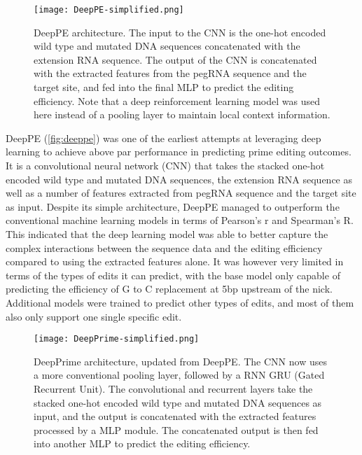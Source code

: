 \begin{figure}
    \centering
    \texttt{[image: DeepPE-simplified.png]}
    \caption[DeepPE architecture]{DeepPE architecture. The input to the CNN is the one-hot encoded wild type and mutated DNA sequences concatenated with the extension RNA sequence. The output of the CNN is concatenated with the extracted features from the pegRNA sequence and the target site, and fed into the final MLP to predict the editing efficiency. Note that a deep reinforcement learning model was used here instead of a pooling layer to maintain local context information.}
    \label{fig:deeppe}
\end{figure}

DeepPE (\autoref{fig:deeppe}) was one of the earliest attempts at leveraging deep learning to achieve above par performance in predicting prime editing outcomes\cite{kimPredictingEfficiencyPrime2021}. It is a convolutional neural network (CNN) that takes the stacked one-hot encoded wild type and  mutated DNA sequences, the extension RNA sequence as well as a number of features extracted from pegRNA sequence and the target site as input. Despite its simple architecture, DeepPE managed to outperform the conventional machine learning models in terms of Pearson's r and Spearman's R. This indicated that the deep learning model was able to better capture the complex interactions between the sequence data and the editing efficiency compared to using the extracted features alone. It was however very limited in terms of the types of edits it can predict, with the base model only capable of predicting the efficiency of G to C replacement at 5bp upstream of the nick. Additional models were trained to predict other types of edits, and most of them also only support one single specific edit.

\begin{figure}
    \centering
    \texttt{[image: DeepPrime-simplified.png]}
    \caption[DeepPrime architecture]{DeepPrime architecture, updated from DeepPE. The CNN now uses a more conventional pooling layer, followed by a RNN GRU (Gated Recurrent Unit). The convolutional and recurrent layers take the stacked one-hot encoded wild type and mutated DNA sequences as input, and the output is concatenated with the extracted features processed by a MLP module. The concatenated output is then fed into another MLP to predict the editing efficiency.}
    \label{fig:deepprime}
\end{figure}

